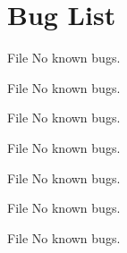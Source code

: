 \chapter{Bug List}
\hypertarget{bug}{}\label{bug}

\begin{DoxyRefList}
\item[File \doxylink{packet__header_8h}{packet\+\_\+header.h} ]\label{bug__bug000005}%
%
No known bugs.  
\item[File \doxylink{receiver_8c}{receiver.c} ]\label{bug__bug000001}%
%
No known bugs.  
\item[File \doxylink{receiver__tcp_8c}{receiver\+\_\+tcp.c} ]\label{bug__bug000003}%
%
No known bugs.  
\item[File \doxylink{rtt__estimates_8h}{rtt\+\_\+estimates.h} ]\label{bug__bug000006}%
%
No known bugs.  
\item[File \doxylink{sender_8c}{sender.c} ]\label{bug__bug000002}%
%
No known bugs.  
\item[File \doxylink{sender__tcp_8c}{sender\+\_\+tcp.c} ]\label{bug__bug000004}%
%
No known bugs.  
\item[File \doxylink{test__output_8h}{test\+\_\+output.h} ]\label{bug__bug000007}%
%
No known bugs. 
\end{DoxyRefList}
